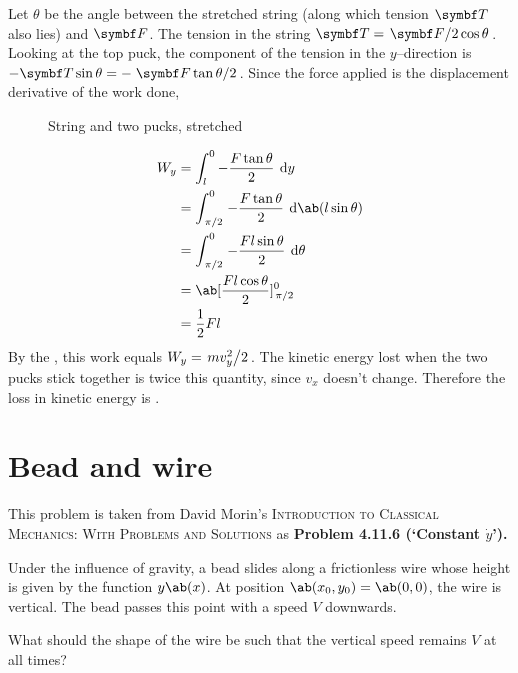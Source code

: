 Let \(\theta\) be the angle between the stretched string (along which
tension \(\mv{T}\) also lies) and \(\mv{F}\). The tension in the
string \(\mv{T} = \lf{\mv{F}}{2\cos\theta}\). Looking at the top
puck, the component of the tension in the \(y\)--direction is
\(-\mv{T}\sin\theta=-\lf{\mv{F}\tan\theta}{2}\). Since the force
applied is the displacement derivative of the work done,
\begin{wrapfigure}{o}{0.5\textwidth}
  \centering
  \caption{String and two pucks, stretched}
  \label{fig:pucksstretched}
\end{wrapfigure}
\begin{align*}
  W_y &= \int_{l}^{0}-\f{F\tan\theta}{2}\:\odif{y} \\
  &= \int_{\lf{\pi}{2}}^{0}-\f{F\tan\theta}{2}\:\odif{\ab(l\sin\theta)}\\
  &= \int_{\lf{\pi}{2}}^{0} -\f{Fl\sin\theta}{2}\:\odif{\theta}\\
  &= \ab[\f{Fl\cos\theta}{2}]_{\lf{\pi}{2}}^0 \\
  &= \f{1}{2}Fl
\end{align*}
By the , this work equals \(W_y =
\lf{mv_y^2}{2}\). The kinetic energy lost when the two pucks stick
together is twice this quantity, since \(v_x\) doesn't change.
Therefore the loss in kinetic energy is .

\section{Bead and wire}
This problem is taken from David Morin's {\scshape Introduction to
Classical Mechanics: With Problems and Solutions}
as \bf{Problem 4.11.6} (`Constant \(\dot{y}\)').

\begin{problem}
  Under the influence of gravity, a bead slides along a frictionless
  wire whose height is given by the function \(y\ab(x)\). At position
  \(\ab(x_0, y_0) = \ab(0,0)\), the wire is vertical. The bead passes
  this point with a speed \(V\) downwards.

  What should the shape of the wire be such that the vertical speed
  remains \(V\) at all times?
\end{problem}

